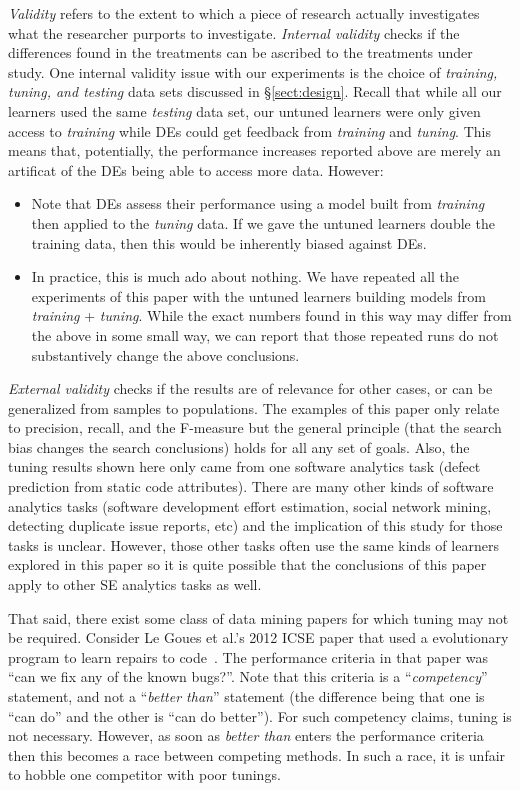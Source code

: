 \documentclass{sig-alternative}
\newcommand{\bi}{\begin{itemize}[leftmargin=0.4cm]}
\newcommand{\ei}{\end{itemize}}
\newcommand{\tion}[1]{\S\ref{sect:#1}}
\begin{document}
{\em Validity} refers to the extent to which a piece of research actually
investigates what the researcher purports to investigate.
{\em Internal validity} checks if the differences found in
the treatments can be ascribed to the treatments under study. 
One internal validity issue with our experiments is the choice
of {\em training, tuning, and testing} data sets discussed in 
\tion{design}. Recall that while all our learners used the same
{\em testing} data set, our untuned learners were only given
access to {\em training} while DEs could get feedback from
{\em training} and
{\em tuning}.  This means that, potentially,  the performance increases
reported above are merely an artificat of the DEs being able to access
more data. However:
\bi
\item Note that
DEs assess their performance using a model built from {\em training}
then applied to the {\em tuning} data. If we gave the untuned
learners double the training data, then this would be inherently
biased against DEs.
\item In practice, this is much ado about nothing. We have
repeated all the experiments of this paper with the untuned
learners building models from {\em training} + {\em tuning}.
While the exact numbers found in this way
may differ from the above in some small way, we can report that 
those repeated runs do not substantively change the above conclusions.
\ei
{\em External validity} checks if the results are of relevance
for other cases, or can be generalized from samples
to populations.  
The examples of this paper  only relate to precision, recall, and the F-measure
but the general principle (that the search bias changes the search conclusions)  holds for all any set of goals. 
Also,
the tuning results shown here only came from one  software analytics task 
(defect prediction from static code attributes).
There are many other kinds of software analytics tasks 
(software development effort estimation, social network mining,
detecting duplicate issue reports, etc) and the implication of this
study for those tasks is unclear. 
However,  those other tasks often use the same kinds of learners
explored in this paper so it is quite possible that
the conclusions of this paper apply to other SE analytics tasks as well. 

That said, there exist some class of data mining papers for which
tuning may not be required. Consider  Le Goues et al.'s 2012
ICSE paper that used a evolutionary program to learn
repairs to code~\cite{leGoues12}. The performance criteria
in that paper was ``can we fix any of the known bugs?''. Note
that this criteria is a ``{\em competency}'' statement, and
not a ``{\em better than}'' statement (the difference being that
one is 
``can do'' and the other is ``can do better''). For such
competency claims, tuning is not necessary. However, as soon
as {\em better than} enters the performance criteria then this
becomes a race between competing methods. In such a race,
it is unfair to hobble one competitor with poor tunings.
\end{document}
